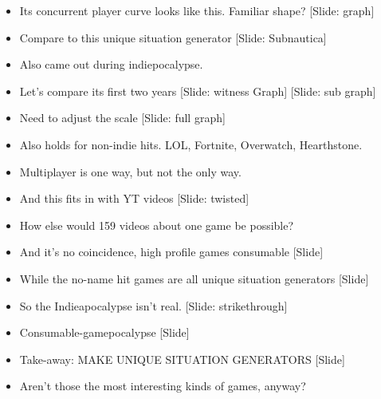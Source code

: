 \documentclass[12pt]{article}
\begin{document}
{\begin{itemize}
\item Its concurrent player curve looks like this.  Familiar shape?  [Slide: graph]

\item Compare to this unique situation generator [Slide:  Subnautica]

\item Also came out during indiepocalypse.

\item Let's compare its first two years [Slide:  witness Graph] [Slide: sub graph]

\item Need to adjust the scale [Slide:  full graph]

\item Also holds for non-indie hits.  LOL, Fortnite, Overwatch, Hearthstone.

\item Multiplayer is one way, but not the only way.

\item And this fits in with YT videos [Slide: twisted]

\item How else would 159 videos about one game be possible?

\item And it's no coincidence, high profile games consumable [Slide]

\item While the no-name hit games are all unique situation generators [Slide]

\item So the Indieapocalypse isn't real. [Slide: strikethrough]

\item Consumable-gamepocalypse [Slide]

\item Take-away:  MAKE UNIQUE SITUATION GENERATORS [Slide]

\item Aren't those the most interesting kinds of games, anyway?

\end{itemize}

}
\end{document}

